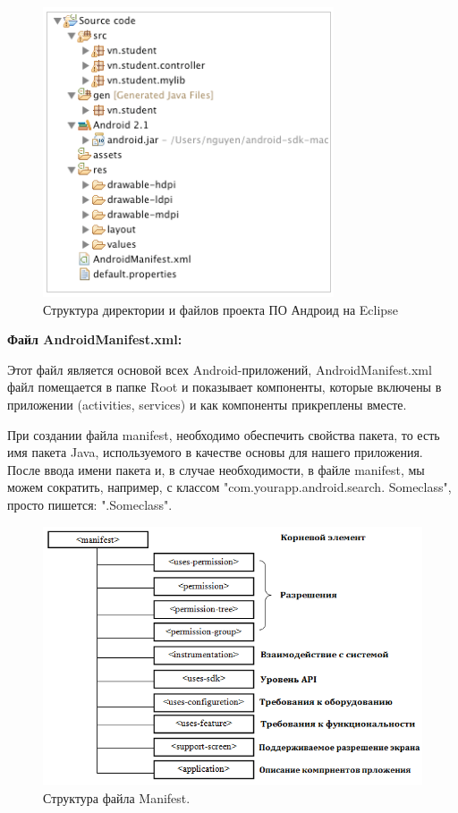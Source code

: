 \begin{figure}[ht!]
\centering
\includegraphics [scale=1] {images/h30.png}
\begin{center}
\caption{Структура директории и файлов проекта ПО Андроид на Eclipse} \label{img30}
\end{center}
\end{figure}
\textbf{Файл AndroidManifest.xml:}

Этот файл является основой всех Android-приложений, AndroidManifest.xml файл помещается в папке Root и показывает компоненты, которые включены в приложении (activities, services) и как компоненты прикреплены вместе.

При создании файла manifest, необходимо обеспечить свойства пакета, то есть имя пакета Java, используемого в качестве основы для нашего приложения. После ввода имени пакета и, в случае необходимости, в файле manifest, мы можем сократить, например, с классом "com.yourapp.android.search. Someclass", просто пишется: ".Someclass".
\begin{figure}[ht!]
\centering
\includegraphics [scale=1] {images/h34.png}
\begin{center}
\caption{Структура файла Manifest.} \label{img34}
\end{center}
\end{figure}

